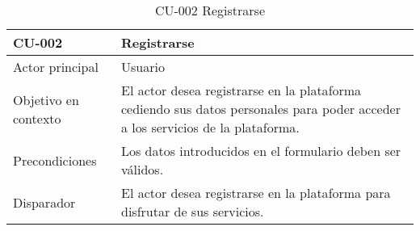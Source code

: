 \begin{table}[]
\centering
\caption{CU-002 Registrarse}
\begin{tabularx}{\textwidth}{|l|X|}
\hline
CU-002                            & Registrarse                                                                                                                                                                                                                                                                                                                                                                                                                    \\ \hline
Actor principal                   & Usuario                                                                                                                                                                                                                                                                                                                                                                                                                        \\ \hline
Objetivo en contexto              & El actor desea registrarse en la plataforma cediendo sus datos personales para poder acceder a los servicios de la plataforma.                                                                                                                                                                                                                                                                                                 \\ \hline
Precondiciones                    & Los datos introducidos en el formulario deben ser válidos.                                                                                                                                                                                                                                                                                                                                                                     \\ \hline
Disparador                        & El actor desea registrarse en la plataforma para disfrutar de sus servicios.                                                                                                                                                                                                                                                                                                                                                   \\ \hline

\end{tabularx}
\end{table}
